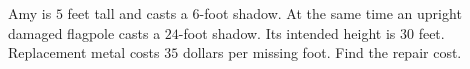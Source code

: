 Amy is $5$ feet tall and casts a $6$-foot shadow. At the same time an upright damaged flagpole casts a $24$-foot shadow. Its intended height is $30$ feet. Replacement metal costs $35$ dollars per missing foot. Find the repair cost.
